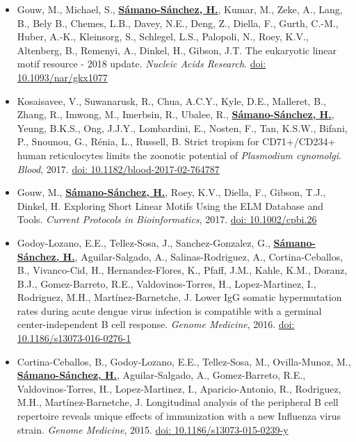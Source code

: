 \documentclass[11pt,a4paper,sans]{moderncv} %
\begin{document}
\begin{itemize}
  \item Gouw, M., Michael, S., \textbf{\underline{S\'amano-S\'anchez, H.}}, Kumar, M., Zeke, A., Lang, B., Bely B., Chemes, L.B., Davey, N.E., Deng, Z., Diella, F., Gurth, C.-M., Huber, A.-K., Kleinsorg, S., Schlegel, L.S., Palopoli, N., Roey, K.V., Altenberg, B., Remenyi, A., Dinkel, H., Gibson, J.T. The eukaryotic linear motif resource - 2018 update. \textit{Nucleic Acids Research}. \href{https://doi.org/10.1093/nar/gkx1077}{doi: 10.1093/nar/gkx1077}
  \item Kosaisavee, V., Suwanarusk, R., Chua, A.C.Y., Kyle, D.E., Malleret, B., Zhang, R., Imwong, M., Imerbsin, R., Ubalee, R., \textbf{\underline{S\'amano-S\'anchez, H.}}, Yeung, B.K.S., Ong, J.J.Y., Lombardini, E., Nosten, F., Tan, K.S.W., Bifani, P., Snounou, G., R\'enia, L., Russell, B. Strict tropism for CD71+/CD234+ human reticulocytes limits the zoonotic potential of \textit{Plasmodium cynomolgi}. \textit{Blood}, 2017. \href{https://doi.org/10.1182/blood-2017-02-764787}{doi: 10.1182/blood-2017-02-764787}
  \item Gouw, M., \textbf{\underline{S\'amano-S\'anchez, H.}}, Roey, K.V., Diella, F., Gibson, T.J., Dinkel, H. Exploring Short Linear Motifs Using the ELM Database and Tools. \textit{Current Protocols in Bioinformatics}, 2017. \href{https://doi.org/10.1002/cpbi.26}{doi: 10.1002/cpbi.26}
  \item Godoy-Lozano, E.E., Tellez-Sosa, J., Sanchez-Gonzalez, G., \textbf{\underline{S\'amano-S\'anchez, H.}}, Aguilar-Salgado, A., Salinas-Rodriguez, A., Cortina-Ceballos, B., Vivanco-Cid, H., Hernandez-Flores, K., Pfaff, J.M., Kahle, K.M., Doranz, B.J., Gomez-Barreto, R.E., Valdovinos-Torres, H., Lopez-Martinez, I., Rodriguez, M.H., Mart\'inez-Barnetche, J. Lower IgG somatic hypermutation rates during acute dengue virus infection is compatible with a germinal center-independent B cell response. \textit{Genome Medicine}, 2016. \href{https://doi.org/10.1186/s13073-016-0276-1}{doi: 10.1186/s13073-016-0276-1}
  \item Cortina-Ceballos, B., Godoy-Lozano, E.E., Tellez-Sosa, M., Ovilla-Munoz, M., \textbf{\underline{S\'amano-S\'anchez, H.}}, Aguilar-Salgado, A., Gomez-Barreto, R.E., Valdovinos-Torres, H., Lopez-Martinez, I., Aparicio-Antonio, R., Rodriguez, M.H., Mart\'inez-Barnetche, J. Longitudinal analysis of the peripheral B cell repertoire reveals unique effects of immunization with a new Influenza virus strain. \textit{Genome Medicine}, 2015. \href{https://doi.org/10.1186/s13073-015-0239-y}{doi: 10.1186/s13073-015-0239-y}

\end{itemize}
\end{document}
